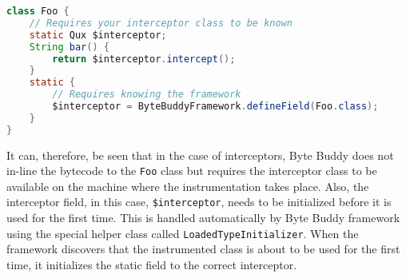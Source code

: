 \begin{lstlisting}[language=Java]
class Foo {
	// Requires your interceptor class to be known
	static Qux $interceptor;
	String bar() {
		return $interceptor.intercept(); 
	}
	static {
		// Requires knowing the framework
		$interceptor = ByteBuddyFramework.defineField(Foo.class);
	}
}
\end{lstlisting}
		
It can, therefore, be seen that in the case of interceptors, Byte Buddy does not in-line the bytecode to the \texttt{Foo} class but requires the interceptor class to be available on the machine where the instrumentation takes place. Also, the interceptor field, in this case, \texttt{\$interceptor}, needs to be initialized before it is used for the first time. This is handled automatically by Byte Buddy framework using the special helper class called \texttt{LoadedTypeInitializer}. When the framework discovers that the instrumented class is about to be used for the first time, it initializes the static field to the correct interceptor.

